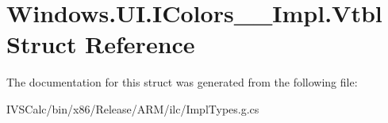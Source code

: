 \hypertarget{struct_windows_1_1_u_i_1_1_i_colors_____impl_1_1_vtbl}{}\section{Windows.\+U\+I.\+I\+Colors\+\_\+\+\_\+\+Impl.\+Vtbl Struct Reference}
\label{struct_windows_1_1_u_i_1_1_i_colors_____impl_1_1_vtbl}


The documentation for this struct was generated from the following file\+:\begin{DoxyCompactItemize}
\item 
I\+V\+S\+Calc/bin/x86/\+Release/\+A\+R\+M/ilc/Impl\+Types.\+g.\+cs\end{DoxyCompactItemize}
